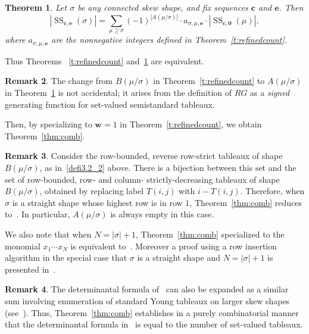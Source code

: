 \documentclass[11pt]{article}
\newtheorem{theorem}{Theorem}[section]
\theoremstyle{definition}
\newtheorem{rema}[theorem]{Remark}
\DeclareMathOperator{\Semi}{SS}
\newcommand{\bfc}{\mathbf{c}}
\newcommand{\bfe}{\mathbf{e}}
\newcommand{\bfw}{\mathbf{w}}
\begin{document}
\begin{theorem} \label{t:refinedcount'} Let $\sigma$ be any connected skew shape, and fix sequences $\bfc$ and $\bfe$. Then 
\[
|\Semi_{\bfc,\bfe}(\sigma)| = \sum_{\mu \supseteq \sigma} (-1)^{|A(\mu/\sigma)|} \cdot a_{\sigma,\mu,\bfe} \cdot |\Semi_{\bfc, \mathbf{0}} (\mu)|,
\]
where $a_{\sigma,\mu,\bfe}$ are the nonnegative integers defined in Theorem~\ref{t:refinedcount}.
\end{theorem}

Thus Theorems ~\ref{t:refinedcount} and~\ref{t:refinedcount'} are equivalent.

\begin{rema}
The change from $B(\mu/\sigma)$ in Theorem~\ref{t:refinedcount} to $A(\mu/\sigma)$ in Theorem~\ref{t:refinedcount'} is not accidental; it arises from the definition of $RG$ as a \emph{signed} generating function for set-valued semistandard tableaux.
\end{rema}

Then, by specializing to $\bfw = 1$ in Theorem~\ref{t:refinedcount}, we obtain Theorem~\ref{thm:comb}.



\begin{rema} \label{rem:connection-to-lenart}
Consider the row-bounded, reverse row-strict tableaux of shape $B(\mu/\sigma)$, as in~\eqref{defi3.2_2} above. There is a bijection between this set and the set of row-bounded, row- and column- strictly-decreasing tableaux of shape $B(\mu/\sigma)$, obtained by replacing label $T(i,j)$ with $i-T(i,j)$. Therefore, when $\sigma$ is a straight shape whose highest row is in row $1$, Theorem~\ref{thm:comb} reduces to~\cite[Theorem~2.2]{lenart-combinatorial}. In particular, $A(\mu/\sigma)$ is always empty in this case. 

We also note that when $N=|\sigma|+1$, Theorem~\ref{thm:comb} specialized to the monomial $x_1\cdots x_N$ is equivalent to~\cite[Theorem~2.8]{clpt}.
Moreover a proof using a row insertion algorithm in the special case that $\sigma$ is a straight shape and $N=|\sigma|+1$ is presented in~\cite[Proposition~3.9]{reiner-tenner-yong}.
\end{rema}




\begin{rema}\label{rem:connection-to-act}
The determinantal formula of~\cite{anderson-chen-tarasca-k-classes} can also be expanded as a similar sum involving enumeration of standard Young tableaux on larger skew shapes (see~\cite[Theorem~C]{anderson-chen-tarasca-k-classes}).
Thus, Theorem~\ref{thm:comb} establishes in a purely combinatorial manner that the determinantal formula in~\cite{anderson-chen-tarasca-k-classes} is equal to the number of set-valued tableaux.
\end{rema}
\end{document}
